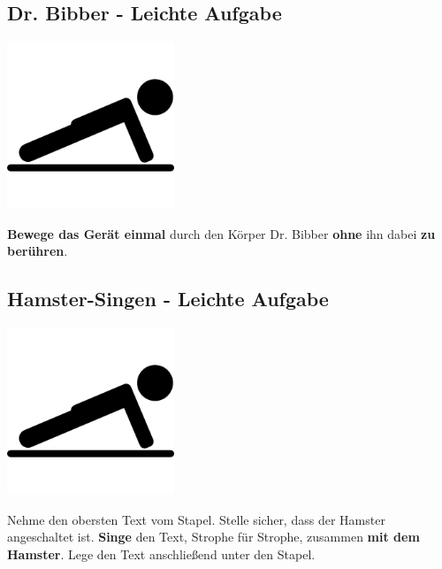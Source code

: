 \subsection{Dr. Bibber - Leichte Aufgabe}
\vfill
\begin{center}
    \includegraphics[height=5cm]{graphics/push_up.png}
\end{center}
\vfill
\textbf{Bewege das Gerät einmal} durch den Körper Dr. Bibber \textbf{ohne} ihn dabei
\textbf{zu berühren}.
\newline
\newpage

\subsection{Hamster-Singen - Leichte Aufgabe}
\vfill
\begin{center}
    \includegraphics[height=5cm]{graphics/push_up.png}
\end{center}
\vfill
Nehme den obersten Text vom Stapel.
Stelle sicher, dass der Hamster angeschaltet ist.
\textbf{Singe} den Text, Strophe für Strophe, zusammen \textbf{mit dem Hamster}.
Lege den Text anschließend unter den Stapel.
\newline
\newpage

